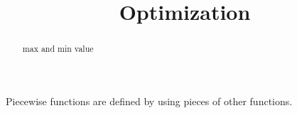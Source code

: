 \documentclass{ximera}
\title{Optimization}
\begin{document}
\begin{abstract}
max and min value
\end{abstract}
\maketitle



Piecewise functions are defined by using pieces of other functions.
\end{document}
